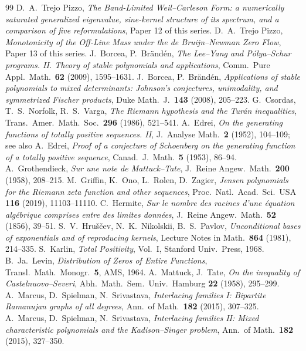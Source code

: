 \documentclass[11pt]{amsart}
\theoremstyle{definition}
\theoremstyle{remark}
\begin{document}
\begin{thebibliography}{99}
 D.~A.~Trejo Pizzo, \emph{The Band-Limited Weil--Carleson Form: a numerically saturated generalized eigenvalue, sine-kernel structure of its spectrum, and a comparison of five reformulations}, Paper 12 of this series.
 D.~A.~Trejo Pizzo, \emph{Monotonicity of the Off-Line Mass under the de Bruijn--Newman Zero Flow}, Paper 13 of this series.
 J.~Borcea, P.~Brändén, \emph{The Lee--Yang and Pólya--Schur programs. II. Theory of stable polynomials and applications}, Comm.\ Pure Appl.\ Math.\ \textbf{62} (2009), 1595--1631.
 J.~Borcea, P.~Brändén, \emph{Applications of stable polynomials to mixed determinants: Johnson's conjectures, unimodality, and symmetrized Fischer products}, Duke Math.\ J.\ \textbf{143} (2008), 205--223.
 G.~Csordas, T.~S.~Norfolk, R.~S.~Varga, \emph{The Riemann hypothesis and the Turán inequalities}, Trans.\ Amer.\ Math.\ Soc.\ \textbf{296} (1986), 521--541.
 A.~Edrei, \emph{On the generating functions of totally positive sequences. II}, J.\ Analyse Math.\ \textbf{2} (1952), 104--109; see also A.~Edrei, \emph{Proof of a conjecture of Schoenberg on the generating function of a totally positive sequence}, Canad.\ J.\ Math.\ \textbf{5} (1953), 86--94.
 A.~Grothendieck, \emph{Sur une note de Mattuck--Tate}, J.\ Reine Angew.\ Math.\ \textbf{200} (1958), 208--215.
 M.~Griffin, K.~Ono, L.~Rolen, D.~Zagier, \emph{Jensen polynomials for the Riemann zeta function and other sequences}, Proc.\ Natl.\ Acad.\ Sci.\ USA \textbf{116} (2019), 11103--11110.
 C.~Hermite, \emph{Sur le nombre des racines d'une équation algébrique comprises entre des limites données}, J.\ Reine Angew.\ Math.\ \textbf{52} (1856), 39--51.
 S.~V.~Hru\v{s}\v{c}ev, N.~K.~Nikolskii, B.~S.~Pavlov, \emph{Unconditional bases of exponentials and of reproducing kernels}, Lecture Notes in Math.\ \textbf{864} (1981), 214--335.
 S.~Karlin, \emph{Total Positivity}, Vol.~I, Stanford Univ.\ Press, 1968.
 B.~Ja.~Levin, \emph{Distribution of Zeros of Entire Functions}, Transl.\ Math.\ Monogr.\ \textbf{5}, AMS, 1964.
 A.~Mattuck, J.~Tate, \emph{On the inequality of Castelnuovo--Severi}, Abh.\ Math.\ Sem.\ Univ.\ Hamburg \textbf{22} (1958), 295--299.
 A.~Marcus, D.~Spielman, N.~Srivastava, \emph{Interlacing families I: Bipartite Ramanujan graphs of all degrees}, Ann.\ of Math.\ \textbf{182} (2015), 307--325.
 A.~Marcus, D.~Spielman, N.~Srivastava, \emph{Interlacing families II: Mixed characteristic polynomials and the Kadison--Singer problem}, Ann.\ of Math.\ \textbf{182} (2015), 327--350.

\end{thebibliography}
\end{document}
